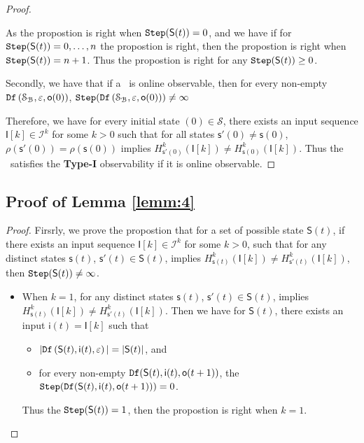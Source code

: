 \begin{appendices}
\begin{proof}
\begin{itemize}
\end{itemize}
As the propostion is right when ${\tt Step}(\mathsf{S}(t))=0$, and we have if for ${\tt Step}(\mathsf{S}(t))=0,\ldots, n$ the propostion is right, then the propostion is right when ${\tt Step}(\mathsf{S}(t))=n+1$. Thus the propostion is right for any ${\tt Step}(\mathsf{S}(t))\ge0$.

Secondly, we have that if a \BCN\ is online observable,
then for every  non-empty ${\tt Df}\left(\mathcal{S}_{\mathcal{B}},\varepsilon, \mathsf{o}(0)\right)$, ${\tt Step}({\tt Df}\left(\mathcal{S}_{\mathcal{B}},\varepsilon, \mathsf{o}(0)\right))\ne \infty$

Therefore, we have for every initial state \State$(0)$$\in \mathcal{S}$, there exists an input sequence $\mathsf{I}[k]\in\mathcal{I}^{k}$ for some $k >0$ such that for all states $\mathsf{s}'(0)\neq \mathsf{s}(0)$, $\rho(\mathsf{s}'(0))=\rho(\mathsf{s}(0))$ implies $H^{k}_{\mathsf{s}'(0)}(\mathsf{I}[k])\neq H^{k}_{{\mathsf{s}(0)}}(\mathsf{I}[k])$. Thus the \BCN\ satisfies the  {\bf Type-I} observability if it is online observable.
\end{proof}

\subsection{Proof of Lemma \ref{lemm:4}}

\begin{proof}
Firsrly, we prove the propostion that for a set of possible state $\mathsf{S}(t)$, if there exists an input sequence $\mathsf{I}[k]\in\mathcal{I}^{k}$ for some $k >0$, such that for any distinct states $\mathsf{s}(t)$, $\mathsf{s}'(t) \in \mathsf{S}(t)$, implies $H^{k}_{\mathsf{s}(t)}(\mathsf{I}[k])\neq H^{k}_{\mathsf{s}'(t)}(\mathsf{I}[k])$, then ${\tt Step}(\mathsf{S}(t))\ne\infty$.

\begin{itemize}
\item When $k=1$, for any distinct states $\mathsf{s}(t)$, $\mathsf{s}'(t) \in \mathsf{S}(t)$, implies $H^{k}_{\mathsf{s}(t)}(\mathsf{I}[k])\neq H^{k}_{\mathsf{s}'(t)}(\mathsf{I}[k])$. Then we have for $\mathsf{S}(t)$,
 there exists an input $\mathsf{i}(t)=\mathsf{I}[k]$ such that
 \begin{itemize}
 \item  $|{\tt Df}\left(\mathsf{S}(t),\mathsf{i}(t),\varepsilon\right)|=|\mathsf{S}(t)|$, and 
 \item  for every non-empty ${\tt Df}(\mathsf{S}(t),\mathsf{i}(t),\mathsf{o}(t+1))$, the ${\tt Step}({\tt Df}(\mathsf{S}(t),\mathsf{i}(t),\mathsf{o}(t+1)))=0$.
 \end{itemize}
Thus the ${\tt Step}(\mathsf{S}(t))=1$, then the propostion is right when $k =1$.


\end{itemize}
\end{proof}
\end{appendices}
